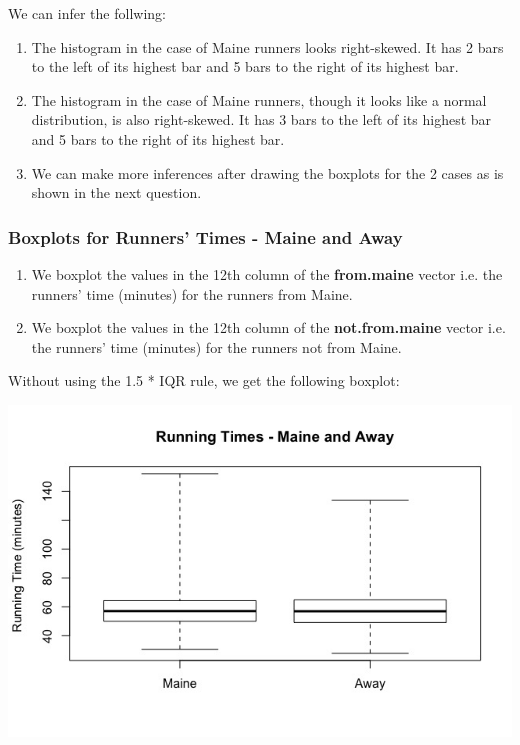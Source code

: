\documentclass[12pt,letterpaper,titlepage,en-US]{article}
\begin{document}
We can infer the follwing:
\begin{enumerate}
\item The histogram in the case of Maine runners looks right-skewed. It has 2 bars to the left of its highest bar and 5 bars to the right of its highest bar.
\item The histogram in the case of Maine runners, though it looks like a normal distribution, is also right-skewed.  It has 3 bars to the left of its highest bar and 5 bars to the right of its highest bar.
 
\item We can make more inferences after drawing the boxplots for the 2 cases as is shown in the next question.



\end{enumerate}

\subsubsection{Boxplots for Runners' Times - Maine and Away}
\begin{enumerate}
\item We boxplot the values in the 12th column of the \textbf{from.maine} vector i.e. the runners' time (minutes) for the runners from Maine.
\item We boxplot the values in the 12th column of the \textbf{not.from.maine} vector i.e. the runners' time (minutes) for the runners not from Maine.
\end{enumerate}
Without using the 1.5 * IQR rule, we get the following boxplot:
\begin{center}
\includegraphics[scale=0.6]{1c2.jpeg}
\end{center}
\end{document}
